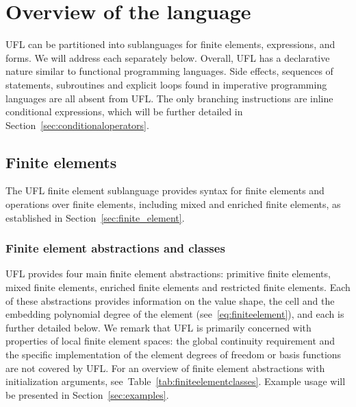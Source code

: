 \documentclass[prodmode,acmtoms]{acmsmall}
\begin{document}
\section{Overview of the language}
\label{sec:language}

UFL can be partitioned into sublanguages for finite elements, expressions,
and forms. We will address each separately below. Overall, UFL has a
declarative nature similar to functional programming languages. Side
effects, sequences of statements, subroutines and explicit loops
found in imperative programming languages are all absent from UFL. The
only branching instructions are inline conditional expressions, which
will be further detailed in Section~\ref{sec:conditionaloperators}.

\subsection{Finite elements}
\label{sec:function_spaces}

The UFL finite element sublanguage provides syntax for finite
elements and operations over finite elements, including mixed and
enriched finite elements, as established in
Section~\ref{sec:finite_element}.

\subsubsection{Finite element abstractions and classes}

UFL provides four main finite element abstractions: primitive finite
elements, mixed finite elements, enriched finite elements and
restricted finite elements. Each of these abstractions provides
information on the value shape, the cell and the embedding polynomial
degree of the element (see~\eqref{eq:finiteelement}), and each is
further detailed below. We remark that UFL is primarily concerned with
properties of local finite element spaces: the global continuity
requirement and the specific implementation of the element degrees of
freedom or basis functions are not covered by UFL. For an overview of
finite element abstractions with initialization arguments,
see~Table~\ref{tab:finiteelementclasses}. Example usage will be
presented in Section~\ref{sec:examples}.
\end{document}
